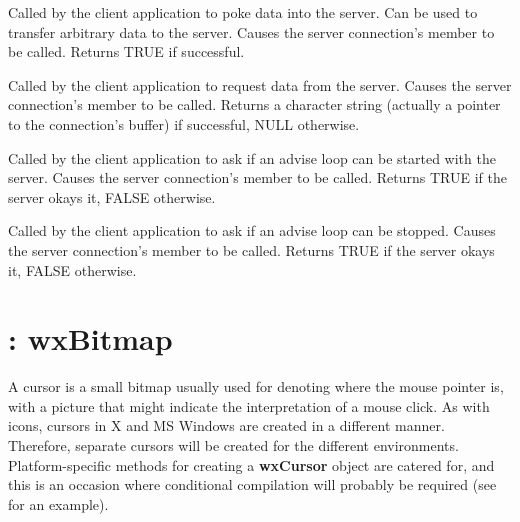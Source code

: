 Called by the client application to poke data into the server. Can be
used to transfer arbitrary data to the server. Causes the server
connection's  member
to be called. Returns TRUE if successful.

\label{wxconnectionrequest}


Called by the client application to request data from the server. Causes
the server connection's  member to be called. Returns a
character string (actually a pointer to the connection's buffer) if
successful, NULL otherwise.

\label{wxconnectionstartadvise}


Called by the client application to ask if an advise loop can be started
with the server. Causes the server connection's \rtfsp
member to be called. Returns TRUE if the server okays it, FALSE
otherwise.

\label{wxconnectionstopadvise}


Called by the client application to ask if an advise loop can be
stopped. Causes the server connection's  member
to be called. Returns TRUE if the server okays it, FALSE otherwise.

\section{: wxBitmap}\label{wxcursor}

A cursor is a small bitmap usually used for denoting where the mouse
pointer is, with a picture that might indicate the interpretation of a
mouse click. As with icons, cursors in X and MS Windows are created
in a different manner. Therefore, separate cursors will be created for the
different environments.  Platform-specific methods for creating a {\bf
wxCursor} object are catered for, and this is an occasion where
conditional compilation will probably be required (see  for
an example).

